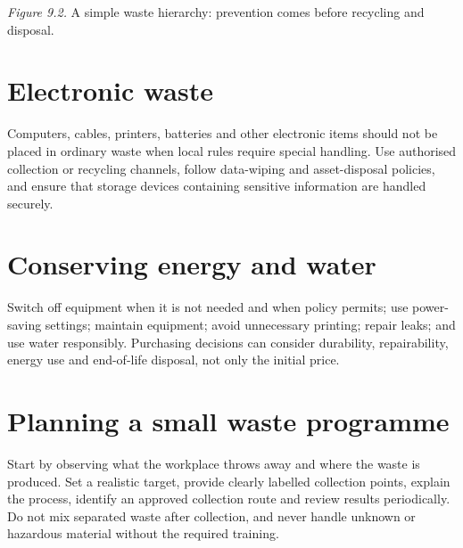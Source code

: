 \documentclass[11pt,openany,oneside]{book}
\begin{document}
\begin{center}
\end{center}
\textit{Figure 9.2.} A simple waste hierarchy: prevention comes before recycling and disposal.

\section{Electronic waste}
Computers, cables, printers, batteries and other electronic items should not be placed in ordinary waste when local rules require special handling. Use authorised collection or recycling channels, follow data-wiping and asset-disposal policies, and ensure that storage devices containing sensitive information are handled securely.

\section{Conserving energy and water}
Switch off equipment when it is not needed and when policy permits; use power-saving settings; maintain equipment; avoid unnecessary printing; repair leaks; and use water responsibly. Purchasing decisions can consider durability, repairability, energy use and end-of-life disposal, not only the initial price.

\section{Planning a small waste programme}
Start by observing what the workplace throws away and where the waste is produced. Set a realistic target, provide clearly labelled collection points, explain the process, identify an approved collection route and review results periodically. Do not mix separated waste after collection, and never handle unknown or hazardous material without the required training.
\end{document}
